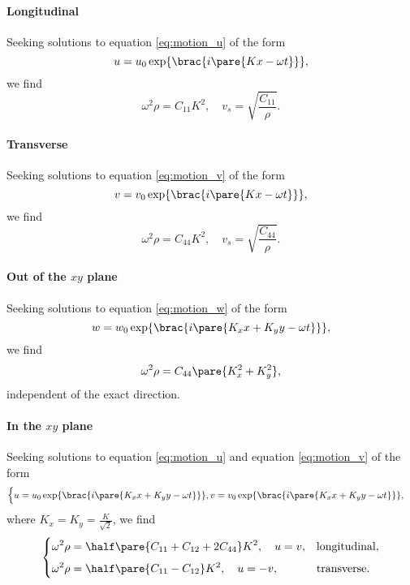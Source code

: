 \documentclass[hidelinks]{article}
\begin{document}

\label{ssub:waves_in_the_100_direction}

\paragraph{Longitudinal} %
\label{par:longitudinal}

Seeking solutions to equation \eqref{eq:motion_u} of the form
\[ u = u_0 \exp\brac{i\pare{Kx - \omega t}}, \]
we find
\[ \omega^2\rho = C_{11}K^2,\quad v_s = \sqrt{\frac{C_{11}}{\rho}}. \]


\paragraph{Transverse} %
\label{par:transverse}

Seeking solutions to equation \eqref{eq:motion_v} of the form
\[ v = v_0 \exp\brac{i\pare{Kx - \omega t}}, \]
we find
\[ \omega^2\rho = C_{44}K^2,\quad v_s = \sqrt{\frac{C_{44}}{\rho}}. \]



\label{ssub:waves_in_the_100_direction}

\paragraph{Out of the $xy$ plane} %
\label{par:shear_wave}

Seeking solutions to equation \eqref{eq:motion_w} of the form
\[ w = w_0 \exp\brac{i\pare{K_x x + K_y y - \omega t}}, \]
we find
\[ \omega^2\rho = C_{44}\pare{K_x^2 + K_y^2}, \]
independent of the exact direction.


\paragraph{In the $xy$ plane} %
\label{par:transverse_wave}

Seeking solutions to equation \eqref{eq:motion_u} and equation \eqref{eq:motion_v} of the form
\[ \begin{cases}
    u = u_0 \exp\brac{i\pare{K_x x + K_y y - \omega t}},
    v = v_0 \exp\brac{i\pare{K_x x + K_y y - \omega t}},
\end{cases} \]
where $\displaystyle K_x = K_y = \frac{K}{\sqrt{2}}$, we find
\[ \begin{cases}
    \displaystyle \omega^2\rho = \half \pare{C_{11} + C_{12} + 2C_{44}}K^2,\quad u=v,& \mathrm{longitudinal}, \\[.5em]
    \displaystyle \omega^2\rho = \half \pare{C_{11} - C_{12}}K^2,\quad u=-v,& \mathrm{transverse}.
\end{cases} \]



\end{document}
